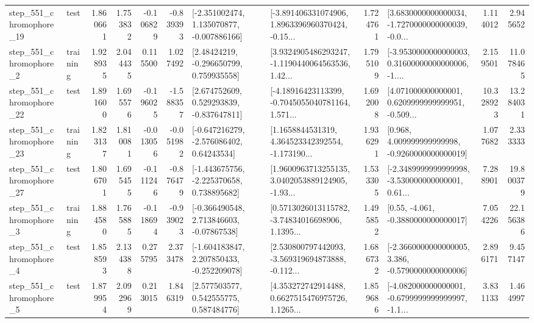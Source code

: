 \begin{tabular}{llrrrrllrlrr}
  step\_551\_chromophore\_19 &      test &      1.860661 &    1.753832 &     -0.106829 & -0.839393 &   [-2.351002474, 1.135070877, -0.007886166] &  [-3.891406331074906, 1.8963396960370424, -0.15... &       1.724761 &  [3.6830000000000034, -1.7270000000000039, -0.0... &            1.114012 &          2.945652 \\
   step\_551\_chromophore\_2 &  training &      1.928935 &    2.044435 &      0.115500 &  1.027492 &     [2.48424219, -0.296650799, 0.759935558] &  [3.9324905486293247, -1.1190440064563536, 1.42... &       1.795109 &  [-3.9530000000000003, 0.31600000000000006, -1.... &            2.159501 &         11.078465 \\
  step\_551\_chromophore\_22 &      test &      1.891600 &    1.695576 &     -0.196025 & -1.588357 &    [2.674752609, 0.529293839, -0.837647811] &  [-4.18916423113399, -0.7045055040781164, 1.571... &       1.692008 &  [4.071000000000001, 0.6209999999999951, -0.509... &           10.328923 &         13.284031 \\
  step\_551\_chromophore\_23 &  training &      1.823137 &    1.810081 &     -0.013056 & -0.051982 &    [-0.647216279, -2.576086402, 0.64243534] &  [1.1658844531319, 4.364523342392554, -1.173190... &       1.936291 &    [0.968, 4.009999999999998, -0.9260000000000019] &            1.077682 &          2.333333 \\
  step\_551\_chromophore\_27 &      test &      1.806701 &    1.695455 &     -0.111246 & -0.876479 &   [-1.443675756, -2.225370658, 0.738895682] &  [1.9600963713255135, 3.0402053889124905, -1.93... &       1.533305 &  [-2.3489999999999998, -3.530000000000001, 0.61... &            7.288901 &         19.800379 \\
   step\_551\_chromophore\_3 &  training &      1.884580 &    1.765885 &     -0.118694 & -0.939023 &    [-0.366490548, 2.713846603, -0.07867538] &  [0.5713026013115782, -3.74834016698906, 1.1395... &       1.495852 &                [0.55, -4.061, -0.3880000000000017] &            7.054226 &         22.156386 \\
   step\_551\_chromophore\_4 &      test &      1.858593 &    2.134388 &      0.275795 &  2.373478 &   [-1.604183847, 2.207850433, -0.252209078] &  [2.530800797442093, -3.569319694873888, -0.112... &       1.686732 &  [-2.3660000000000005, 3.386, -0.5790000000000006] &            2.896171 &          9.457147 \\
   step\_551\_chromophore\_5 &      test &      1.879954 &    2.092969 &      0.213015 &  1.846319 &     [2.577503577, 0.542555775, 0.587484776] &  [4.353272742914488, 0.6627515476975726, 1.1265... &       1.859686 &  [-4.082000000000001, -0.6799999999999997, -1.1... &            3.831133 &          1.464997 \\

\end{tabular}
